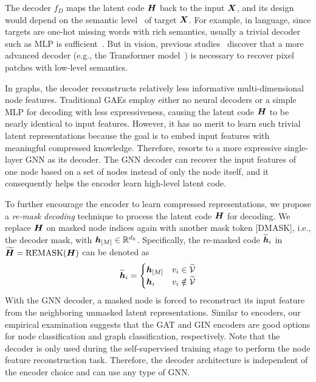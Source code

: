 The decoder $f_D$ maps the latent code ${\bm{H}}$ back to the input ${\bm{X}}$, 
and its design 
would
depend on the semantic level~\cite{he2021masked} of target ${\bm{X}}$. 
For example, in language, since targets are one-hot missing words with rich semantics, usually a trivial decoder such as MLP is sufficient~\cite{devlin2019bert}. 
But in vision,  previous studies~\cite{he2021masked} discover that a more advanced decoder (e.g., the Transformer model~\cite{vaswani2017attention}) is necessary to recover pixel patches with low-level semantics.


In graphs, the decoder reconstructs relatively less informative multi-dimensional node features. 
Traditional GAEs employ either no neural decoders or a simple MLP for decoding with less expressiveness, causing the latent code ${\bm{H}}$ to be nearly identical to input features. 
However, it has no merit to learn such trivial latent representations because the goal is to embed input features with  meaningful compressed knowledge. 
Therefore, \model resorts to a more expressive single-layer GNN as its decoder. 
The GNN decoder can recover the input features of one node based on a set of nodes instead of only the node itself, and it consequently helps the encoder learn high-level latent code. 


To further encourage the encoder to learn compressed representations, we propose a \textit{re-mask decoding} technique to process the latent code ${\bm{H}}$ for decoding. 
We replace ${\bm{H}}$ on masked node indices again with another mask token [DMASK], i.e., the decoder mask, with ${\bm{h}}_{[M]} \in \mathbb{R}^{d_h}$. 
Specifically, the re-masked code $\widetilde{{\bm{h}}}_i$ in $\widetilde{{\bm{H}}} = \mathrm{REMASK}({\bm{H}})$ can be denoted as 
$$
\widetilde{{\bm{h}}}_i = 
    \begin{cases}
        {\bm{h}}_{[M]} &  v_i \in \widetilde{\mathcal{V}} \\
        {\bm{h}}_i  &   v_i \notin \widetilde{\mathcal{V}} 
    \end{cases}
$$
With the GNN decoder, a masked node is forced to reconstruct its input feature from the neighboring unmasked latent representations. 
Similar to encoders, our empirical examination suggests that the GAT and GIN encoders are good options for node classification and  graph classification, respectively. 
Note that the decoder is only used during the self-supervised training stage to perform the node feature reconstruction task. 
Therefore, the decoder architecture is independent of the encoder choice and can use any type of GNN.









